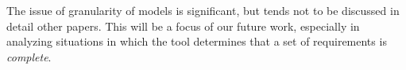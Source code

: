 The issue of granularity of models is significant, but tends not to be discussed in detail other papers.  This will be a focus of our future work, especially in analyzing situations in which the tool determines that a set of requirements is {\em complete}.

